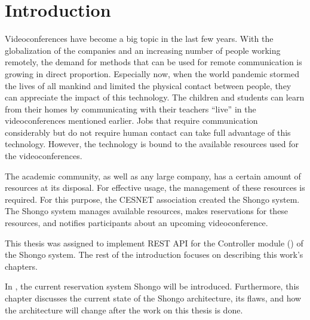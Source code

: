 \chapter*{Introduction}

Videoconferences have become a big topic in the last few years. With the globalization of the companies and an increasing number of people working remotely, the demand for methods that can be used for remote communication is growing in direct proportion.
Especially now, when the world pandemic stormed the lives of all mankind and limited the physical contact between people, they can appreciate the impact of this technology. The children and students can learn from their homes by communicating with their teachers \enquote{live} in the videoconferences mentioned earlier. Jobs that require communication considerably but do not require human contact can take full advantage of this technology.
However, the technology is bound to the available resources used for the videoconferences.

The academic community, as well as any large company, has a certain amount of resources at its disposal. For effective usage, the management of these resources is required.
For this purpose, the CESNET association created the Shongo system. The Shongo system manages available resources, makes reservations for these resources, and notifies participants about an upcoming videoconference.

This thesis was assigned to implement REST API for the Controller module () of the Shongo system. The rest of the introduction focuses on describing this work's chapters.

In , the current reservation system Shongo will be introduced. Furthermore, this chapter discusses the current state of the Shongo architecture, its flaws, and how the architecture will change after the work on this thesis is done.

